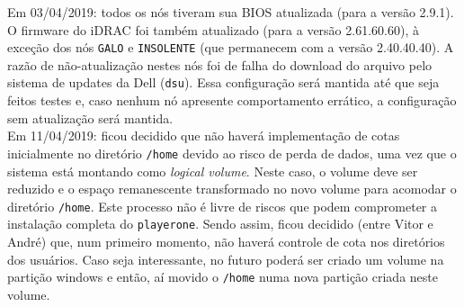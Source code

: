 
Em 03/04/2019: todos os nós tiveram sua BIOS atualizada (para a versão 2.9.1). O firmware do iDRAC foi também atualizado (para a versão 2.61.60.60), à exceção dos nós \texttt{GALO} e \texttt{INSOLENTE} (que permanecem com a versão 2.40.40.40). A razão de não-atualização nestes nós foi de falha do download do arquivo pelo sistema de updates da Dell (\texttt{dsu}). Essa configuração será mantida 
até que seja feitos testes e, caso nenhum nó apresente comportamento errático, 
a configuração sem atualização será mantida.\\

Em 11/04/2019: ficou decidido que não haverá implementação de cotas inicialmente no diretório \texttt{/home} devido ao risco de perda de dados, uma vez que o sistema  está montando como \textit{logical volume}. Neste caso, o volume deve ser reduzido e o espaço remanescente transformado no novo volume para acomodar o diretório \texttt{/home}. Este processo não é livre de riscos que podem comprometer a instalação completa do \texttt{playerone}. Sendo assim, ficou decidido (entre Vitor e André) que, num primeiro momento, não haverá controle de cota nos diretórios dos usuários. Caso seja interessante, no futuro poderá ser criado um volume na partição windows e então, aí movido o \texttt{/home} numa nova partição criada neste volume.


